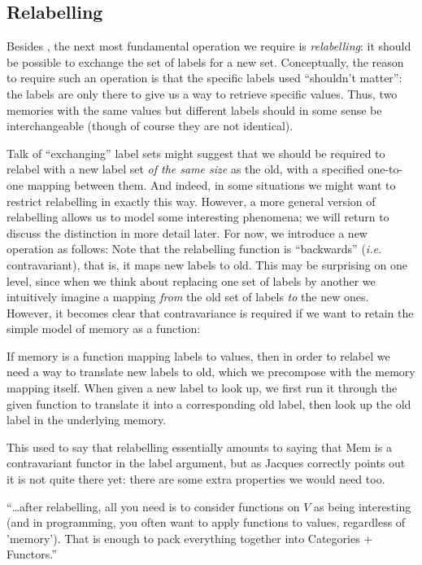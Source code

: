 \documentclass{jfp}
\begin{document}
\subsection{Relabelling}
\label{sec:relabelling}

Besides , the next most fundamental operation we
require is \emph{relabelling}: it should be possible to exchange the
set of labels for a new set.  Conceptually, the reason to require such
an operation is that the specific labels used ``shouldn't matter'':
the labels are only there to give us a way to retrieve specific
values.  Thus, two memories with the same values but different labels
should in some sense be interchangeable (though of course they are not
identical).

Talk of ``exchanging'' label sets might suggest that we should be
required to relabel with a new label set \emph{of the same size} as
the old, with a specified one-to-one mapping between them.  And
indeed, in some situations we might want to restrict relabelling in
exactly this way.  However, a more general version of relabelling
allows us to model some interesting phenomena; we will return to
discuss the distinction in more detail later.  For now, we introduce a
new  operation as follows:
 Note that the
relabelling function is ``backwards'' (\emph{i.e.} contravariant),
that is, it maps new labels to old.  This may be surprising on one
level, since when we think about replacing one set of labels by
another we intuitively imagine a mapping \emph{from} the old set of
labels \emph{to} the new ones. However, it becomes clear that
contravariance is required if we want to retain the simple model of
memory as a function:


If memory is a function mapping labels to values, then in order to
relabel we need a way to translate new labels to old, which we
precompose with the memory mapping itself.  When given a new label to
look up, we first run it through the given function to translate it
into a corresponding old label, then look up the old label in the
underlying memory.

\begin{commentary}
  This used to say that relabelling essentially amounts to saying that
  Mem is a contravariant functor in the label argument, but as Jacques
  correctly points out it is not quite there yet: there are some extra
  properties we would need too.

  ``\dots after relabelling, all you need is to consider functions on
  $V$ as being interesting (and in programming, you often want to
  apply functions to values, regardless of 'memory'). That is enough
  to pack everything together into Categories + Functors.''
\end{commentary}
\end{document}
